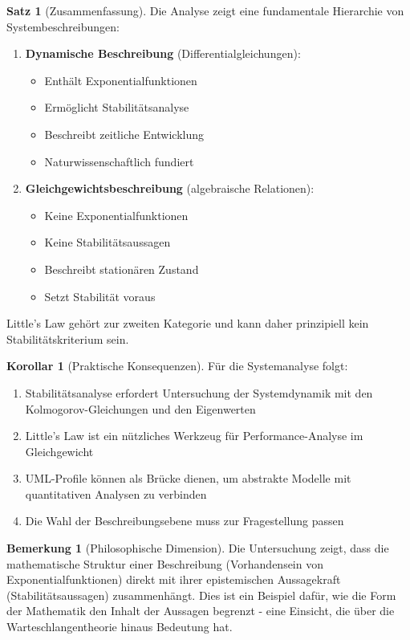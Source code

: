 ﻿\documentclass[a4paper,12pt]{report}
\theoremstyle{definition}
\newtheorem{bemerkung}{Bemerkung}[section]
\newtheorem{satz}{Satz}[section]
\newtheorem{korollar}{Korollar}[section]
\begin{document}
\begin{satz}[Zusammenfassung]
	Die Analyse zeigt eine fundamentale Hierarchie von Systembeschreibungen:
	\begin{enumerate}
		\item[-] \textbf{Dynamische Beschreibung} (Differentialgleichungen):
		\begin{itemize}
			\item[-] Enthält Exponentialfunktionen
			\item[-] Ermöglicht Stabilitätsanalyse
			\item[-] Beschreibt zeitliche Entwicklung
			\item[-] Naturwissenschaftlich fundiert
		\end{itemize}
		
		\item[-] \textbf{Gleichgewichtsbeschreibung} (algebraische Relationen):
		\begin{itemize}
			\item[-] Keine Exponentialfunktionen
			\item[-] Keine Stabilitätsaussagen
			\item[-] Beschreibt stationären Zustand
			\item[-] Setzt Stabilität voraus
		\end{itemize}
	\end{enumerate}
	
	Little's Law gehört zur zweiten Kategorie und kann daher prinzipiell kein Stabilitätskriterium sein.
\end{satz}

\begin{korollar}[Praktische Konsequenzen]
	Für die Systemanalyse folgt:
	\begin{enumerate}
		\item[-] Stabilitätsanalyse erfordert Untersuchung der Systemdynamik mit den Kolmogorov-Gleichun\-gen und den Eigenwerten
		\item[-] Little's Law ist ein nützliches Werkzeug für Performance-Analyse im Gleichgewicht
		\item[-] UML-Profile können als Brücke dienen, um abstrakte Modelle mit quantitativen Analysen zu verbinden
		\item[-] Die Wahl der Beschreibungsebene muss zur Fragestellung passen
	\end{enumerate}
\end{korollar}

\begin{bemerkung}[Philosophische Dimension]
	Die Untersuchung zeigt, dass die mathematische Struktur einer Beschreibung (Vorhandensein von Exponentialfunktionen) direkt mit ihrer epistemischen Aussagekraft (Stabilitätsaussagen) zusammenhängt. Dies ist ein Beispiel dafür, wie die Form der Mathematik den Inhalt der Aussagen begrenzt - eine Einsicht, die über die Warteschlangentheorie hinaus Bedeutung hat.
\end{bemerkung}
\end{document}
